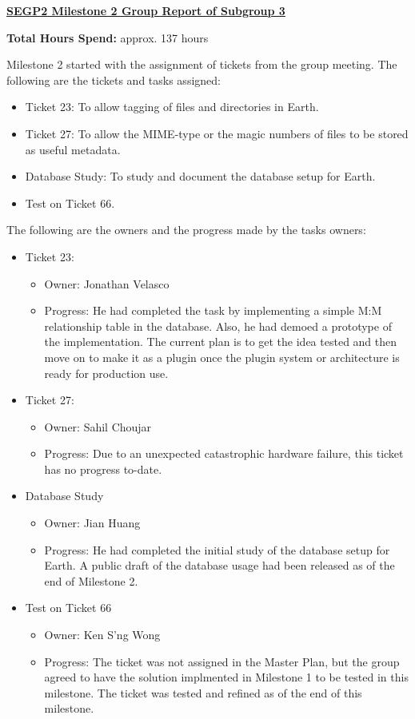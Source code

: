 \documentclass{letter}
\begin{document}
{\large \textbf{\underline{SEGP2 Milestone 2 Group Report of Subgroup 3}}}

\textbf{Total Hours Spend:} approx. 137 hours

Milestone 2 started with the assignment of tickets from the group meeting. The following are the tickets and tasks assigned:

\begin{itemize}
   \item Ticket 23: To allow tagging of files and directories in Earth.
   \item Ticket 27: To allow the MIME-type or the magic numbers of files to be stored as useful metadata.
   \item Database Study: To study and document the database setup for Earth.
   \item Test on Ticket 66.
\end{itemize}

The following are the owners and the progress made by the tasks owners:

\begin{itemize}
   \item Ticket 23:
      \begin{itemize}
         \item Owner: Jonathan Velasco
         \item Progress: He had completed the task by implementing a simple M:M relationship table in the database. Also, he had demoed a prototype of the implementation. The current plan is to get the idea tested and then move on to make it as a plugin once the plugin system or architecture is ready for production use. 
      \end{itemize}
   \item Ticket 27:
      \begin{itemize}
         \item Owner: Sahil Choujar
         \item Progress: Due to an unexpected catastrophic hardware failure, this ticket has no progress to-date. 
      \end{itemize}
   \item Database Study
      \begin{itemize}
         \item Owner: Jian Huang
         \item Progress: He had completed the initial study of the database setup for Earth. A public draft of the database usage had been released as of the end of Milestone 2. 
      \end{itemize}
   \item Test on Ticket 66
      \begin{itemize}
         \item Owner: Ken S'ng Wong
         \item Progress: The ticket was not assigned in the Master Plan, but the group agreed to have the solution implmented in Milestone 1 to be tested in this milestone. The ticket was tested and refined as of the end of this milestone. 
      \end{itemize}
\end{itemize}
\end{document}
